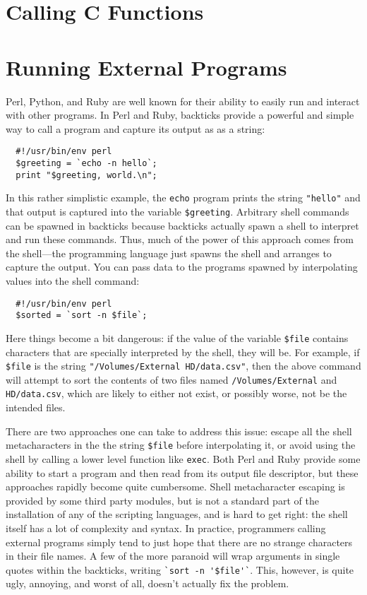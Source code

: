 \documentclass{article}
\begin{document}
\section{Calling C Functions}
\section{Running External Programs}

Perl, Python, and Ruby are well known for their ability to easily run and interact with other programs.
In Perl and Ruby, backticks provide a powerful and simple way to call a program and capture its output as as a string:
\begin{verbatim}
  #!/usr/bin/env perl
  $greeting = `echo -n hello`;
  print "$greeting, world.\n";
\end{verbatim}
In this rather simplistic example, the \verb|echo| program prints the string \verb|"hello"| and that output is captured into the variable \verb|$greeting|.
Arbitrary shell commands can be spawned in backticks because backticks actually spawn a shell to interpret and run these commands.
Thus, much of the power of this approach comes from the shell---the programming language just spawns the shell and arranges to capture the output.
You can pass data to the programs spawned by interpolating values into the shell command:
\begin{verbatim}
  #!/usr/bin/env perl
  $sorted = `sort -n $file`;
\end{verbatim}
Here things become a bit dangerous:
if the value of the variable \verb|$file| contains characters that are specially interpreted by the shell, they will be.
For example, if \verb|$file| is the string \verb|"/Volumes/External HD/data.csv"|, then the above command will attempt to sort the contents of two files named \verb|/Volumes/External| and \verb|HD/data.csv|, which are likely to either not exist, or possibly worse, not be the intended files.

There are two approaches one can take to address this issue: escape all the shell metacharacters in the the string \verb|$file| before interpolating it, or avoid using the shell by calling a lower level function like \verb|exec|.
Both Perl and Ruby provide some ability to start a program and then read from its output file descriptor, but these approaches rapidly become quite cumbersome.
Shell metacharacter escaping is provided by some third party modules, but is not a standard part of the installation of any of the scripting languages, and is hard to get right:
the shell itself has a lot of complexity and syntax.
In practice, programmers calling external programs simply tend to just hope that there are no strange characters in their file names.
A few of the more paranoid will wrap arguments in single quotes within the backticks, writing \verb|`sort -n '$file'`|.
This, however, is quite ugly, annoying, and worst of all, doesn't actually fix the problem.
\end{document}
